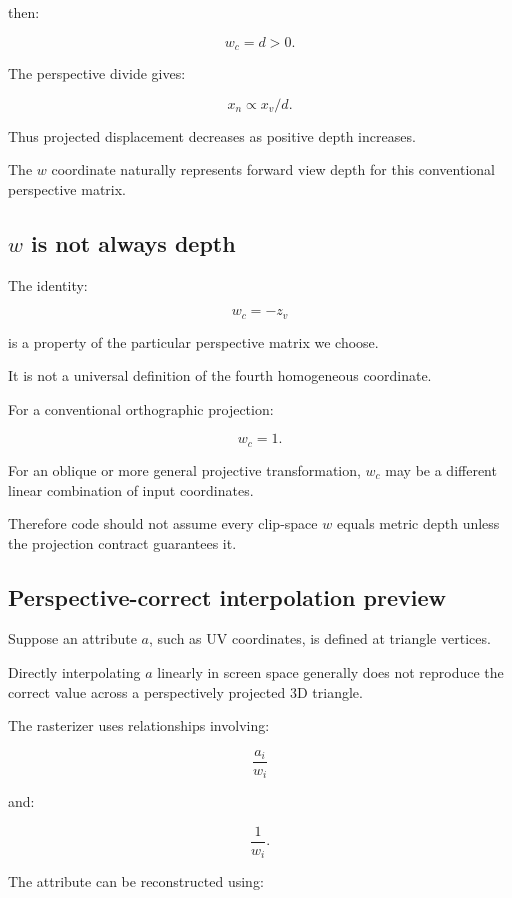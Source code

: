then:

\[
 w_c=d>0.
\]

The perspective divide gives:

\[
 x_n\propto x_v/d.
\]

Thus projected displacement decreases as positive depth increases.

The \(w\) coordinate naturally represents forward view depth for this conventional perspective matrix.

\subsection{\texorpdfstring{\(w\) is not always depth}{w is not always depth}}\label{02-foundations-ii-ch033-w-is-not-always-depth}

The identity:

\[
 w_c=-z_v
\]

is a property of the particular perspective matrix we choose.

It is not a universal definition of the fourth homogeneous coordinate.

For a conventional orthographic projection:

\[
 w_c=1.
\]

For an oblique or more general projective transformation, \(w_c\) may be a different linear combination of input coordinates.

Therefore code should not assume every clip-space \(w\) equals metric depth unless the projection contract guarantees it.

\subsection{Perspective-correct interpolation preview}\label{02-foundations-ii-ch033-perspective-correct-interpolation-preview}

Suppose an attribute \(a\), such as UV coordinates, is defined at triangle vertices.

Directly interpolating \(a\) linearly in screen space generally does not reproduce the correct value across a perspectively projected 3D triangle.

The rasterizer uses relationships involving:

\[
 \frac{a_i}{w_i}
\]

and:

\[
 \frac1{w_i}.
\]

The attribute can be reconstructed using:

